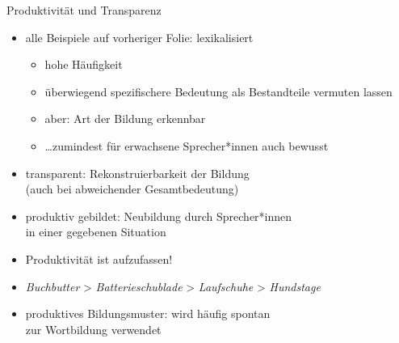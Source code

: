 \begin{frame}
  {Produktivität und Transparenz}
  \pause
  \begin{itemize}[<+->]
    \item \alert{alle} Beispiele auf vorheriger Folie: \alert{lexikalisiert}
      \begin{itemize}[<+->]
        \item hohe Häufigkeit
        \item überwiegend spezifischere Bedeutung als Bestandteile vermuten lassen
        \item aber: Art der Bildung erkennbar
        \item \ldots zumindest für erwachsene Sprecher*innen auch bewusst
      \end{itemize}
      \Halbzeile
    \item \alert{transparent}: Rekonstruierbarkeit der Bildung\\
      (auch bei abweichender Gesamtbedeutung)
      \Halbzeile
    \item \alert{produktiv gebildet}: Neubildung durch Sprecher*innen\\
      in einer gegebenen Situation
    \item Produktivität ist  aufzufassen!
    \item \textit{Buchbutter} > \textit{Batterieschublade} > \textit{Laufschuhe} > \textit{Hundstage}
      \Halbzeile
    \item \alert{produktives Bildungsmuster}: wird häufig spontan\\
      zur Wortbildung verwendet
  \end{itemize}
\end{frame}


